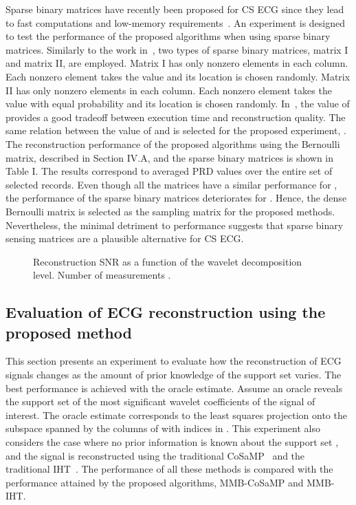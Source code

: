 \documentclass[journal]{IEEEtran}
\begin{document}
Sparse binary matrices have recently been proposed for CS ECG since they lead to fast computations and low-memory requirements~\cite{Mama11}. An experiment is designed to test the performance of the proposed algorithms when using sparse binary matrices. Similarly to the work in~\cite{Mama11}, two types of sparse binary matrices, matrix I and matrix II, are employed. Matrix I has only  nonzero elements in each column. Each nonzero element takes the value  and its location is chosen randomly. Matrix II has only  nonzero elements in each column. Each nonzero element takes the value  with equal probability and its location is chosen randomly. In~\cite{Mama11}, the value of  provides a good tradeoff between execution time and reconstruction quality. The same relation between the value of  and  is selected for the proposed experiment, . The reconstruction performance of the proposed algorithms using the Bernoulli matrix, described in Section IV.A, and the sparse binary matrices is shown in Table I. The results correspond to averaged PRD values over the entire set of selected records. Even though all the matrices have a similar performance for , the performance of the sparse binary matrices deteriorates for . Hence, the dense Bernoulli matrix is selected as the sampling matrix for the proposed methods. Nevertheless, the minimal detriment to performance suggests that sparse binary sensing matrices are a plausible alternative for CS ECG.

\begin{figure}[t]
\caption{Reconstruction SNR as a function of the wavelet decomposition level. Number of measurements .} \label{fig:dl}
\end{figure}












\subsection{Evaluation of ECG reconstruction using the proposed method}
This section presents an experiment to evaluate how the reconstruction of ECG signals changes as the amount of prior knowledge of the support set varies. The best performance is achieved with the oracle estimate. Assume an oracle reveals the support set  of the  most significant wavelet coefficients of the signal of interest. The oracle estimate corresponds to the least squares projection onto the subspace spanned by the columns of  with indices in . This experiment also considers the case where no prior information is known about the support set , and the signal is reconstructed using the traditional CoSaMP~\cite{Need08} and the traditional IHT~\cite{Blum09}. The performance of all these methods is compared with the performance attained by the proposed algorithms, MMB-CoSaMP and MMB-IHT.
\end{document}
